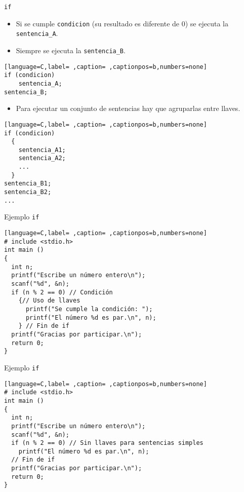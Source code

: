 \documentclass[usenames,svgnames,dvipsnames, aspectratio=169]{beamer}
\begin{document}
\begin{frame}[label={sec:orge58f450},fragile]{\texttt{if}}
 \begin{itemize}
\item Si se cumple \texttt{condicion} (su resultado es \alert{diferente de 0}) se ejecuta la \texttt{sentencia\_A}.
\item \alert{Siempre} se ejecuta la \texttt{sentencia\_B}.
\end{itemize}
\begin{lstlisting}[language=C,label= ,caption= ,captionpos=b,numbers=none]
if (condicion)
    sentencia_A;
sentencia_B;
\end{lstlisting}
\begin{itemize}
\item Para ejecutar un conjunto de sentencias hay que agruparlas \alert{entre llaves}.
\end{itemize}
\begin{lstlisting}[language=C,label= ,caption= ,captionpos=b,numbers=none]
if (condicion)
  {
    sentencia_A1;
    sentencia_A2;
    ...
  }
sentencia_B1;
sentencia_B2;
...
\end{lstlisting}
\end{frame}

\begin{frame}[label={sec:orgfb44ecf},fragile]{Ejemplo \texttt{if}}
 \begin{lstlisting}[language=C,label= ,caption= ,captionpos=b,numbers=none]
# include <stdio.h>
int main ()
{
  int n;
  printf("Escribe un número entero\n");
  scanf("%d", &n);
  if (n % 2 == 0) // Condición
    {// Uso de llaves
      printf("Se cumple la condición: ");
      printf("El número %d es par.\n", n);      
    } // Fin de if
  printf("Gracias por participar.\n");
  return 0;
}
\end{lstlisting}
\end{frame}

\begin{frame}[label={sec:orga2b0018},fragile]{Ejemplo \texttt{if}}
 \begin{lstlisting}[language=C,label= ,caption= ,captionpos=b,numbers=none]
# include <stdio.h>
int main ()
{
  int n;
  printf("Escribe un número entero\n");
  scanf("%d", &n);
  if (n % 2 == 0) // Sin llaves para sentencias simples
    printf("El número %d es par.\n", n);
  // Fin de if
  printf("Gracias por participar.\n");
  return 0;
}
\end{lstlisting}
\end{frame}
\end{document}
